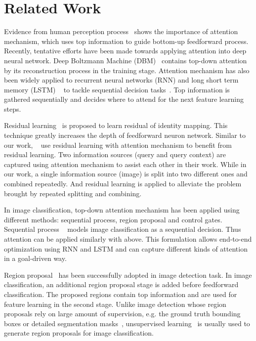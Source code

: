 \documentclass[10pt,twocolumn,letterpaper]{article}
\begin{document}
\section{Related Work}


Evidence from human perception process~\cite{mnih2014recurrent} shows the importance of attention mechanism, which uses top information to guide bottom-up feedforward process. Recently, tentative efforts have been made towards applying attention into deep neural network. Deep Boltzmann Machine (DBM)~\cite{larochelle2010learning} contains top-down attention by its reconstruction process in the training stage. Attention mechanism has also been widely applied to recurrent neural networks (RNN) and long short term memory (LSTM) ~\cite{hochreiter1997long} to tackle sequential decision tasks~\cite{noh2015learning, srivastava2015training, larochelle2010learning, kim2016multimodal}. Top information is gathered sequentially and decides where to attend for the next feature learning steps.

Residual learning~\cite{resnet2016} is proposed to learn residual of identity mapping. This technique greatly increases the depth of feedforward neuron network. Similar to our work, ~\cite{noh2015learning, srivastava2015training, larochelle2010learning, kim2016multimodal} use residual learning with attention mechanism to benefit from residual learning. Two information sources (query and query context) are captured using attention mechanism to assist each other in their work. While in our work, a single information source (image) is split into two different ones and combined repeatedly. And residual learning is applied to alleviate the problem brought by repeated splitting and combining.

In image classification, top-down attention mechanism has been applied using different methods: sequential process, region proposal and control gates. Sequential process ~\cite{mnih2014recurrent,hendricks2015deep,xu2015show,gregor2015draw} models image classification as a sequential decision. Thus attention can be applied similarly with above. This formulation allows end-to-end optimization using RNN and LSTM and can capture different kinds of attention in a goal-driven way.

Region proposal~\cite{shrivastava2016contextual,dai2015convolutional,hariharan2014simultaneous,yang2015faceness} has been successfully adopted in image detection task. In image classification, an additional region proposal stage is added before feedforward classification. The proposed regions contain top information and are used for feature learning in the second stage. Unlike image detection whose region proposals rely on large amount of supervision, e.g. the ground truth bounding boxes or detailed segmentation masks~\cite{erhan2014scalable}, unsupervised learning~\cite{xiao2015application} is usually used to generate region proposals for image classification.
\end{document}

